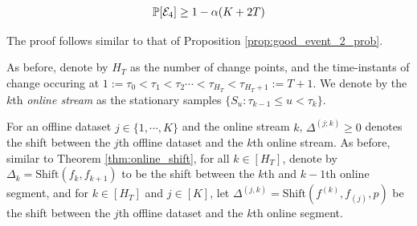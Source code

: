 {\begin{proposition}
    \begin{align*}
        \mathbb{P}[{\mathcal{E}}_4] \geq 1- \alpha (K+2T)
    \end{align*}
    \label{prop:}
\end{proposition}
The proof follows similar to that of Proposition \ref{prop:good_event_2_prob}. 


As before, denote by $H_T$ as the number of change points, and the time-instants of change occuring at $1:= \tau_0 < \tau_1 < \tau_2 \cdots < \tau_{H_T} < \tau_{H_T+1}:= T+1$. We denote by the $k$th \emph{online stream} as the stationary samples $\{S_u : \tau_{k-1} \leq u < \tau_{k} \}$. 

For an offline dataset $j \in \{1,\cdots, K\}$ and the online stream $k$, $\Delta^{(j;k)} \geq 0$ denotes the shift between the $j$th offline dataset and the $k$th online stream. As before, similar to Theorem \ref{thm:online_shift}, for all $k \in [H_T]$, denote by $\Delta_{k} = \text{Shift} (f_{k},f_{k+1})$ to be the shift between the $k$th and $k-1$th online segment, and for $k \in [H_T]$ and $j \in [K]$, let $\Delta^{(j,k)} = \text{Shift} (f^{(k)},f_{(j)},p)$ be the shift between the $j$th offline dataset and the $k$th online segment. 

}

